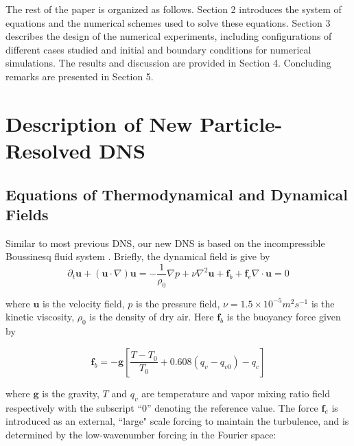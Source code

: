 \documentclass[draft,jgrga]{AGUTeX}
\begin{document}
\begin{article}
The rest of the paper is organized as follows. Section 2 introduces the system of equations and the numerical schemes used to solve these equations. Section 3 describes the design of the numerical experiments, including configurations of different cases studied and initial and boundary conditions for numerical simulations. The results and discussion are provided in Section 4. Concluding remarks are presented in Section 5. 

\section{Description of New Particle-Resolved DNS}\label{particle_dns}

\subsection{Equations of Thermodynamical and Dynamical Fields}

Similar to most previous DNS, our new DNS is based on the incompressible
Boussinesq fluid system \cite{And04}. Briefly, the dynamical field is give by
\begin{subequations}

\begin{equation}
\partial_{t}\mathbf{u}+(\mathbf{u}\cdot\nabla)\mathbf{u}=-\frac{1}{\rho_{0}}\nabla p+\nu\nabla^2 \mathbf{u}+\mathbf{f}_b + \mathbf{f}_e\label{eq:NS1}
\end{equation}


\begin{equation}
\nabla\cdot \mathbf{u}=0\label{eq:NS2}
\end{equation}

\end{subequations}

where $\mathbf{u}$ is the velocity field, $p$ is the pressure field, $\nu = 1.5\times 10^{-5}m^2s^{-1}$ is the kinetic viscosity, $\rho_{0}$ is the density of dry air. Here $\mathbf{f}_b$ is the buoyancy force given by 

\begin{equation}
\mathbf{f}_b= 
-\mathbf{g}[\frac{T-T_{0}}{T_0}+0.608(q_{v}-q_{v0})-q_{c}]
\label{eq:source_term}
\end{equation}

where $\mathbf{g}$ is the gravity, $T$ and $q_{v}$ are temperature
and vapor mixing ratio field respectively with the subscript ``$0$''
denoting the reference value. The force $\mathbf{f}_e$ is introduced as an 
external, ``large" scale forcing to maintain the turbulence, and is determined 
by the low-wavenumber forcing in the Fourier space:


\end{article}
\end{document}

